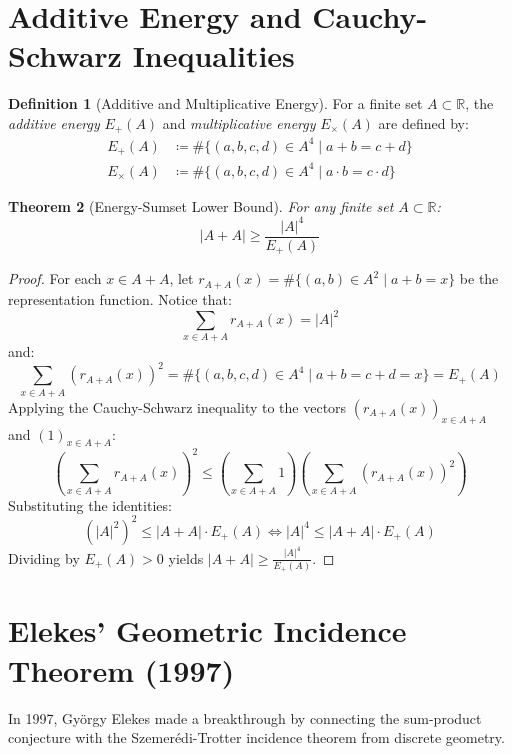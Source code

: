 \documentclass[11pt,a4paper]{article}
\newtheorem{theorem}{Theorem}[section]
\theoremstyle{definition}
\newtheorem{definition}[theorem]{Definition}
\begin{document}
\section{Additive Energy and Cauchy-Schwarz Inequalities}

\begin{definition}[Additive and Multiplicative Energy]\label{def:energy}
For a finite set $A \subset \mathbb{R}$, the \emph{additive energy} $E_+(A)$ and \emph{multiplicative energy} $E_\times(A)$ are defined by:
\begin{align}
E_+(A) &\coloneqq \#\{(a, b, c, d) \in A^4 \mid a + b = c + d\} \label{eq:add_energy} \\
E_\times(A) &\coloneqq \#\{(a, b, c, d) \in A^4 \mid a \cdot b = c \cdot d\} \label{eq:mult_energy}
\end{align}
\end{definition}

\begin{theorem}[Energy-Sumset Lower Bound]\label{thm:energy_cs}
For any finite set $A \subset \mathbb{R}$:
\begin{equation}\label{eq:energy_bound}
|A + A| \ge \frac{|A|^4}{E_+(A)}
\end{equation}
\end{theorem}

\begin{proof}
For each $x \in A + A$, let $r_{A+A}(x) = \#\{(a, b) \in A^2 \mid a + b = x\}$ be the representation function.
Notice that:
\[ \sum_{x \in A+A} r_{A+A}(x) = |A|^2 \]
and:
\[ \sum_{x \in A+A} (r_{A+A}(x))^2 = \#\{(a, b, c, d) \in A^4 \mid a + b = c + d = x\} = E_+(A) \]
Applying the Cauchy-Schwarz inequality to the vectors $(r_{A+A}(x))_{x \in A+A}$ and $(1)_{x \in A+A}$:
\[ \left(\sum_{x \in A+A} r_{A+A}(x)\right)^2 \le \left(\sum_{x \in A+A} 1\right) \left(\sum_{x \in A+A} (r_{A+A}(x))^2\right) \]
Substituting the identities:
\[ (|A|^2)^2 \le |A+A| \cdot E_+(A) \iff |A|^4 \le |A+A| \cdot E_+(A) \]
Dividing by $E_+(A) > 0$ yields $|A+A| \ge \frac{|A|^4}{E_+(A)}$.
\end{proof}

\section{Elekes' Geometric Incidence Theorem (1997)}

In 1997, Gy\"orgy Elekes \cite{elekes1997} made a breakthrough by connecting the sum-product conjecture with the Szemer\'edi-Trotter incidence theorem from discrete geometry.
\end{document}
